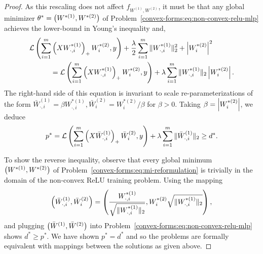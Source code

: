 \begin{proof}
    As this rescaling does not affect \( f_{W^{(1)}, W^{(2)}} \), it must be that any
    global minimizer \( \theta^* = \left(W^{*(1)}, W^{*(2)}\right) \) of
    Problem~\ref{convex-forms:eq:non-convex-relu-mlp} achieves the lower-bound
    in Young's inequality and,
    \begin{align}\label{convex-forms:eq:inner-product-reformulation}
         & \mathcal{L}\left(\sum_{i = 1}^m \left(X W^{*(1)}_{\cdot, i}\right)_+ W^{*(2)}_{i}, y\right) + \frac{\lambda}{2} \sum_{i = 1}^m \|W^{*(1)}_{\cdot, i}\|_2^2 + \left\vert W^{*(2)}_{i}\right\vert^2 \\
         & \hspace{3em} =
        \mathcal{L}\left(\sum_{i = 1}^m \left(X W^{*(1)}_{\cdot, i}\right)_+ W^{*(2)}_{i}, y\right) + \lambda \sum_{i = 1}^m \|W^{*(1)}_{\cdot, i}\|_2\left\vert W^{*(2)}_{i}\right\vert.
    \end{align}
    The right-hand side of this equation is invariant to scale
    re-parameterizations of the form
    \( \bar{W}^{(1)}_{\cdot, i} = \beta
    W^{*(1)}_{\cdot, i}, \bar{W}^{(2)}_{i} = W^{*(2)}_{i} / \beta \)
    for \( \beta > 0 \).
    Taking \( \beta = \left\vert W^{*(2)}_{i}\right\vert \), we deduce
    \begin{align*}
        p^* = \mathcal{L}\left(\sum_{i = 1}^m \left(X \bar{W}^{(1)}_{\cdot, i}\right)_+ \bar{W}^{(2)}_{i}, y\right) + \lambda \sum_{i = 1}^m \|\bar{W}^{(1)}_{\cdot, i}\|_2 \geq d^*.
    \end{align*}

    To show the reverse inequality, observe that every global minimum \(
    \left(W^{*(1)}, W^{*(2)}\right) \) of
    Problem~\ref{convex-forms:eq:mi-reformulation} is trivially in the domain
    of the non-convex ReLU training problem.
    Using the mapping
    \[ \left(\bar{W}^{(1)}_{\cdot, i}, \bar{W}^{(2)}_{i}\right)
        = \left(\frac{W^{*(1)}_{\cdot, i}}{\sqrt{\|W^{*(1)}_{\cdot, i}\|_2}},
            W^{*(2)}_i \sqrt{\|W^{*(1)}_{\cdot, i}\|_2}\right),
    \]
    and plugging \( \left(\bar{W}^{(1)}, \bar{W}^{(2)}\right) \) into
    Problem~\ref{convex-forms:eq:non-convex-relu-mlp} shows \( d^* \geq p^* \).
    We have shown \( p^* = d^* \) and so the problems are formally equivalent
    with mappings between the solutions as given above.
\end{proof}

